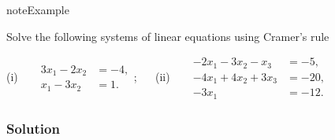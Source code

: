 \documentclass[letterpaper,10pt,english]{jupyterBook}
\begin{document}
\label{None:cramers-rule-example}
\begin{sphinxadmonition}{note}{Example }



\sphinxAtStartPar
Solve the following systems of linear equations using Cramer’s rule

\sphinxAtStartPar
(i)   \(\begin{array}{rl}
    3x_1 - 2x_2  \!\!\!\! &= -4, \\
    x_1 - 3x_2  \!\!\!\! &= 1.
\end{array}\);  
(ii)   \(\begin{array}{rl}
    -2x_1 - 3x_2 - x_3 \!\!\!\!  &= -5, \\
    -4x_1 + 4x_2 + 3x_3  \!\!\!\! &= -20, \\
    -3x_1  \!\!\!\! &= -12.
\end{array}\)
\subsubsection*{Solution}


\end{sphinxadmonition}
\end{document}
